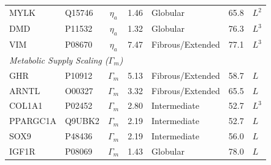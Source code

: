 \begin{table}[h!]
\begin{tabular}{llcclll}
MYLK & Q15746 & $\eta_{a}$ & 1.46 & Globular & 65.8 & $L^2$ \\
DMD & P11532 & $\eta_{a}$ & 1.32 & Globular & 76.3 & $L^3$ \\
VIM & P08670 & $\eta_{a}$ & 7.47 & Fibrous/Extended & 77.1 & $L^3$ \\
\midrule
\multicolumn{7}{l}{\textit{Metabolic Supply Scaling ($\Gamma_m$)}} \\
GHR & P10912 & $\Gamma_{m}$ & 5.13 & Fibrous/Extended & 58.7 & $L$ \\
ARNTL & O00327 & $\Gamma_{m}$ & 3.32 & Fibrous/Extended & 65.5 & $L$ \\
COL1A1 & P02452 & $\Gamma_{m}$ & 2.80 & Intermediate & 52.7 & $L^3$ \\
PPARGC1A & Q9UBK2 & $\Gamma_{m}$ & 2.19 & Intermediate & 52.7 & $L$ \\
SOX9 & P48436 & $\Gamma_{m}$ & 2.19 & Intermediate & 56.0 & $L$ \\
IGF1R & P08069 & $\Gamma_{m}$ & 1.43 & Globular & 78.0 & $L$ \\
\bottomrule
\end{tabular}
\end{table}
